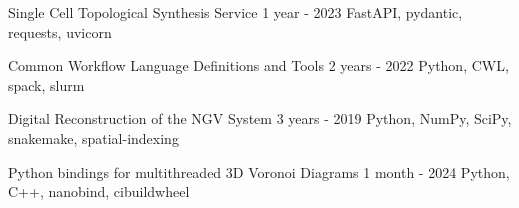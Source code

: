 


\begin{cventries}

\cvproject
{Single Cell Topological Synthesis Service} %
{1 year - 2023} %
{ %
    \href{https://github.com/BlueBrain/morphology-synthesis-api}{\faGithubSquare}
    FastAPI, pydantic, requests, uvicorn
}

\cvproject
{Common Workflow Language Definitions and Tools}
{2 years - 2022}
{
  \href{https://github.com/BlueBrain/blue-cwl}{\faGithubSquare}
  Python, CWL, spack, slurm
}



\cvproject
{Digital Reconstruction of the NGV System} %
{3 years - 2019} %
{ %
    \href{https://github.com/BlueBrain/ArchNGV}{\faGithubSquare}
    Python, NumPy, SciPy, snakemake, spatial-indexing
}


\cvproject
{Python bindings for multithreaded 3D Voronoi Diagrams} %
{1 month - 2024} %
{ %
    \href{https://github.com/eleftherioszisis/multivoro}{\faGithubSquare}
    Python, C++, nanobind, cibuildwheel
}


\end{cventries}
